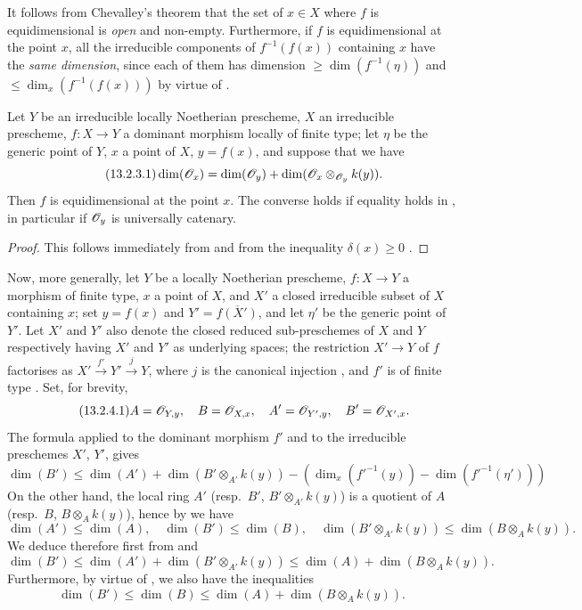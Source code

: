It follows from Chevalley's theorem  that the set of $x\in X$ where $f$ is equidimensional is \emph{open} and non-empty.
Furthermore, if $f$ is equidimensional at the point $x$, all the irreducible components of $f^{-1}(f(x))$ containing $x$ have the \emph{same dimension}, since each of them has dimension $\geq\dim(f^{-1}(\eta))$  and $\leq\dim_x(f^{-1}(f(x)))$ by virtue of .

\begin{proposition}[13.2.3]
\label{IV.13.2.3}
Let $Y$ be an irreducible locally Noetherian prescheme, $X$ an irreducible prescheme, $f:X\to Y$ a dominant morphism locally of finite type; let $\eta$ be the generic point of $Y$, $x$ a point of $X$, $y=f(x)$, and suppose that we have
\[
\label{IV.13.2.3.1}
\tag{13.2.3.1}
  \dim(\mathscr{O}_x)=\dim(\mathscr{O}_y)+\dim(\mathscr{O}_x\otimes_{\mathscr{O}_y}k(y)).
\]
Then $f$ is equidimensional at the point $x$.
The converse holds if equality holds in , in particular if $\mathscr{O}_y$ is universally catenary.
\end{proposition}

\begin{proof}
This follows immediately from  and from the inequality $\delta(x)\geq 0$ .
\end{proof}

\begin{env}[13.2.4]
\label{IV.13.2.4}
Now, more generally, let $Y$ be a locally Noetherian prescheme, $f:X\to Y$ a morphism of finite type, $x$ a point of $X$, and $X'$ a closed irreducible subset of $X$ containing $x$; set $y=f(x)$ and $Y'=\overline{f(X')}$, and let $\eta'$ be the generic point of $Y'$.
Let $X'$ and $Y'$ also denote the closed reduced sub-preschemes of $X$ and $Y$ respectively having $X'$ and $Y'$ as underlying spaces; the restriction $X'\to Y$ of $f$ factorises as $X'\xrightarrow{f'}Y'\xrightarrow{j}Y$, where $j$ is the canonical injection , and $f'$ is of finite type .
Set, for brevity,
\[
\label{IV.13.2.4.1}
\tag{13.2.4.1}
  A=\mathscr{O}_{Y,y},\quad B=\mathscr{O}_{X,x},\quad A'=\mathscr{O}_{Y',y},\quad B'=\mathscr{O}_{X',x}.
\]
The formula  applied to the dominant morphism $f'$ and to the irreducible preschemes $X'$, $Y'$, gives
\[
\label{IV.13.2.4.2}
\tag{13.2.4.2}
  \dim(B')\leq\dim(A')+\dim(B'\otimes_{A'}k(y))-(\dim_x(f'^{-1}(y))-\dim(f'^{-1}(\eta')))
\]
On the other hand, the local ring $A'$ (resp.\ $B'$, $B'\otimes_{A'}k(y)$) is a quotient of $A$ (resp.\ $B$, $B\otimes_A k(y)$), hence by  we have
\[
\tag{13.2.4.3}
\label{IV.13.2.4.3}
  \dim(A')\leq\dim(A),\quad \dim(B')\leq\dim(B),\quad \dim(B'\otimes_{A'}k(y))\leq\dim(B\otimes_A k(y)).
\]
We deduce therefore first from  and 
\[
\label{IV.13.2.4.4}
\tag{13.2.4.4}
  \dim(B')\leq\dim(A')+\dim(B'\otimes_{A'}k(y))\leq\dim(A)+\dim(B\otimes_A k(y)).
\]
Furthermore, by virtue of , we also have the inequalities
\[
\label{IV.13.2.4.5}
\tag{13.2.4.5}
  \dim(B')\leq\dim(B)\leq\dim(A)+\dim(B\otimes_A k(y)).
\]
\end{env}

